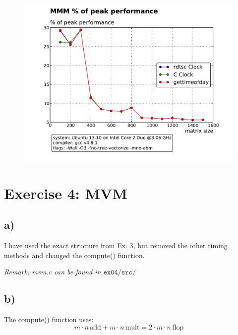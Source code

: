 \documentclass[11pt]{article}
\newcommand{\unit}[1]{\ensuremath{\, \mathrm{#1}}}			%
\begin{document}
			\begin{figure}[H]
				\includegraphics[width = 6in]{MMM_percentageO3.pdf}
			\end{figure}
	
	\section*{Exercise 4: MVM}
		\subsection*{a)} 
		I have used the exact structure from Ex. 3, but removed the other timing methods and changed the compute() function.\par 
		\emph{Remark: mvm.c can be found in $\mathtt{ex04/src/}$}
		\subsection*{b)}
		The compute() function uses:
		\[ m \cdot n \unit{add} + m \cdot n \unit{mult} = 2 \cdot m \cdot n \unit{flop} \]
\end{document}
